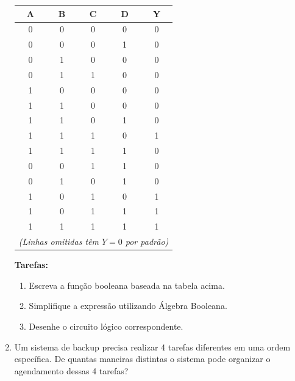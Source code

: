 \documentclass[12pt,a4paper]{article}
\newcommand{\resposta}[1]{
\noindent
\framebox[\textwidth]{
\begin{minipage}{0.98\textwidth}
\vspace{#1}
\end{minipage}
}
}
\begin{document}
\begin{enumerate}
    \medskip
    \begin{minipage}[c]{0.5\textwidth}
        \centering
        \renewcommand{\arraystretch}{1.2}
        \begin{tabular}{|c|c|c|c||c|}
          \hline
          \textbf{A} & \textbf{B} & \textbf{C} & \textbf{D} & \textbf{Y} \\
          \hline
          0 & 0 & 0 & 0 & 0 \\
          0 & 0 & 0 & 1 & 0 \\
          0 & 1 & 0 & 0 & 0 \\
          0 & 1 & 1 & 0 & 0 \\
          1 & 0 & 0 & 0 & 0 \\
          1 & 1 & 0 & 0 & 0 \\
          1 & 1 & 0 & 1 & 0 \\
          1 & 1 & 1 & 0 & 1 \\
          1 & 1 & 1 & 1 & 0 \\
          0 & 0 & 1 & 1 & 0 \\
          0 & 1 & 0 & 1 & 0 \\
          1 & 0 & 1 & 0 & 1 \\
          1 & 0 & 1 & 1 & 1 \\
          1 & 1 & 1 & 1 & 1 \\
          \multicolumn{5}{|c|}{\textit{(Linhas omitidas têm $Y=0$ por padrão)}} \\
          \hline
        \end{tabular}
    \end{minipage}
    \hfill
    \begin{minipage}[c]{0.45\textwidth}
        \textbf{Tarefas:}\\
        \begin{enumerate}[label=\textbf{\alph*)}, leftmargin=1cm]
          \item Escreva a função booleana baseada na tabela acima.
          \item Simplifique a expressão utilizando Álgebra Booleana.
          \item Desenhe o circuito lógico correspondente.
        \end{enumerate}
    \end{minipage}
    
    \resposta{12cm}

    \item Um sistema de backup precisa realizar 4 tarefas diferentes em uma ordem específica. De quantas maneiras distintas o sistema pode organizar o agendamento dessas 4 tarefas?
    

\end{enumerate}
\end{document}

